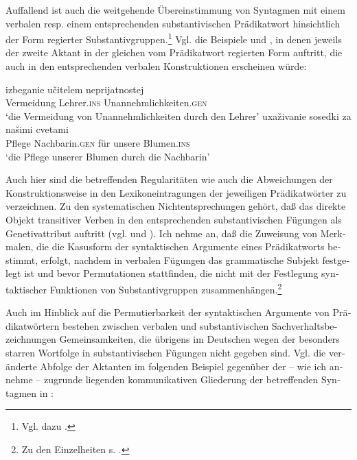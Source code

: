 \documentclass[output=paper]{langscibook}
\begin{document}
\begin{otherlanguage}{german}
Auffallend ist auch die weitgehende Übereinstimmung von Syntagmen mit einem verbalen resp. einem entsprechenden substantivischen Prädikatwort hinsichtlich der Form regierter Substantivgruppen.\footnote{Vgl. dazu \citet{zimmermann1967der-parallelismus-verbaler-und-substantivischer-konstruktionen-in-der-russischen-sprache-der-gegenwart}.} Vgl. die Beispiele  und , in denen jeweils der zweite Aktant in der gleichen vom Prädikatwort regierten Form auftritt, die auch in den entsprechenden verbalen Konstruktionen erscheinen würde:

\ea \label{ex:zi83:6}
    \gll izbeganie učitelem neprijatnostej \\
    Vermeidung  Lehrer.\textsc{ins} Unannehmlichkeiten.\textsc{gen} \\
    \glt ‘die Vermeidung von Unannehmlichkeiten durch den Lehrer’
\ex \label{ex:zi83:7}
    \gll uxaživanie sosedki za našimi cvetami \\
     Pflege Nachbarin.\textsc{gen} für unsere Blumen.\textsc{ins} \\
    \glt ‘die Pflege unserer Blumen durch die Nachbarin’
\z

\noindent Auch hier sind die betreffenden Regularitäten wie auch die Abweichungen der Konstruktionsweise in den Lexikoneintragungen der jeweiligen Prädikatwörter zu verzeichnen. Zu den systematischen Nichtentsprechungen gehört, daß das direkte Objekt transitiver Verben in den entsprechenden substantivischen Fügungen als Genetivattribut auftritt (vgl.  und ). Ich nehme an, daß die Zuweisung von Merkmalen, die die Kasusform der syntaktischen Argumente eines Prädikatworts bestimmt, erfolgt, nachdem in verbalen Fügungen das grammatische Subjekt festgelegt ist und bevor Permutationen stattfinden, die nicht mit der Festlegung syntaktischer Funktionen von Substantivgruppen zusammenhängen.\footnote{Zu den Einzelheiten s. \citet{zimmermann1967der-parallelismus-verbaler-und-substantivischer-konstruktionen-in-der-russischen-sprache-der-gegenwart, zimmermann1978sintaksiceskie-funkcii-aktantov-zalog-i-perechodnost}.}

Auch im Hinblick auf die Permutierbarkeit der syntaktischen Argumente von Prädikatwörtern bestehen zwischen verbalen und substantivischen Sachverhaltsbezeichnungen Gemeinsamkeiten, die übrigens im Deutschen wegen der besonders starren Wortfolge in substantivischen Fügungen nicht gegeben sind. Vgl. die veränderte Abfolge der Aktanten im folgenden Beispiel %
gegenüber der -- wie ich annehme -- zugrunde liegenden kommunikativen Gliederung der betreffenden Syntagmen in :


\end{otherlanguage}
\end{document}
